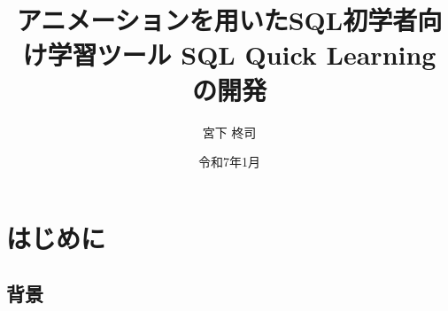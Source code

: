\documentclass[uplatex,a4paper,12pt]{ujreport}
\title{アニメーションを用いたSQL初学者向け学習ツール SQL Quick Learning の開発}
\author{宮下 柊司}
\date{令和7年1月}
\begin{document}
\thispagestyle{empty}
\maketitle

\begin{abstract}
\end{abstract}

\tableofcontents

\setcounter{page}{0}


\chapter{はじめに}
\section{背景}
\end{document}
